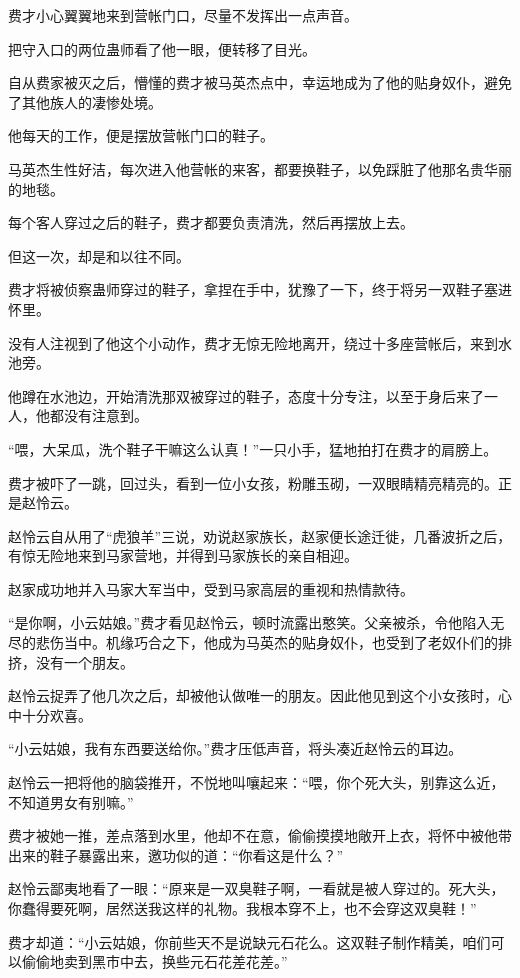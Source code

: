 \begin{this_body}
费才小心翼翼地来到营帐门口，尽量不发挥出一点声音。

把守入口的两位蛊师看了他一眼，便转移了目光。

自从费家被灭之后，懵懂的费才被马英杰点中，幸运地成为了他的贴身奴仆，避免了其他族人的凄惨处境。

他每天的工作，便是摆放营帐门口的鞋子。

马英杰生性好洁，每次进入他营帐的来客，都要换鞋子，以免踩脏了他那名贵华丽的地毯。

每个客人穿过之后的鞋子，费才都要负责清洗，然后再摆放上去。

但这一次，却是和以往不同。

费才将被侦察蛊师穿过的鞋子，拿捏在手中，犹豫了一下，终于将另一双鞋子塞进怀里。

没有人注视到了他这个小动作，费才无惊无险地离开，绕过十多座营帐后，来到水池旁。

他蹲在水池边，开始清洗那双被穿过的鞋子，态度十分专注，以至于身后来了一人，他都没有注意到。

“喂，大呆瓜，洗个鞋子干嘛这么认真！”一只小手，猛地拍打在费才的肩膀上。

费才被吓了一跳，回过头，看到一位小女孩，粉雕玉砌，一双眼睛精亮精亮的。正是赵怜云。

赵怜云自从用了“虎狼羊”三说，劝说赵家族长，赵家便长途迁徙，几番波折之后，有惊无险地来到马家营地，并得到马家族长的亲自相迎。

赵家成功地并入马家大军当中，受到马家高层的重视和热情款待。

“是你啊，小云姑娘。”费才看见赵怜云，顿时流露出憨笑。父亲被杀，令他陷入无尽的悲伤当中。机缘巧合之下，他成为马英杰的贴身奴仆，也受到了老奴仆们的排挤，没有一个朋友。

赵怜云捉弄了他几次之后，却被他认做唯一的朋友。因此他见到这个小女孩时，心中十分欢喜。

“小云姑娘，我有东西要送给你。”费才压低声音，将头凑近赵怜云的耳边。

赵怜云一把将他的脑袋推开，不悦地叫嚷起来：“喂，你个死大头，别靠这么近，不知道男女有别嘛。”

费才被她一推，差点落到水里，他却不在意，偷偷摸摸地敞开上衣，将怀中被他带出来的鞋子暴露出来，邀功似的道：“你看这是什么？”

赵怜云鄙夷地看了一眼：“原来是一双臭鞋子啊，一看就是被人穿过的。死大头，你蠢得要死啊，居然送我这样的礼物。我根本穿不上，也不会穿这双臭鞋！”

费才却道：“小云姑娘，你前些天不是说缺元石花么。这双鞋子制作精美，咱们可以偷偷地卖到黑市中去，换些元石花差花差。”


\end{this_body}

